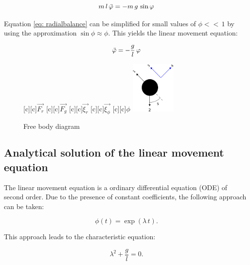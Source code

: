 \documentclass[12pt,bibstyle=none,pagenumberinfooter]{ifmdocument}
\begin{document}
\begin{equation}
\label{eq: tangentialbalance}
    m\, l \, \Ddot{\phi} = -m\, g \,\sin{\phi}
\end{equation}

Equation \ref{eq: radialbalance} can be simplified for small values of $\phi <<\, 1$ by using the approximation $\sin{\phi} \approx \phi $. This yields the linear movement equation:

\begin{equation}
    \Ddot{\phi} = -\frac{g}{l}\,\phi
\end{equation}





\begin{figure}[h]
  \begin{center}
    {
        \psfragscanon
      [c][c]{$\vec{F_r}$}
      [c][c]{$\vec{F_g}$}
      [c][c]{$\vec{\xi_r}$}
      [c][c]{$\vec{\xi_{\phi}}$}
      [c][c]{$\phi$}
      \includegraphics[width=0.2\textwidth]{Figures/Zeichnung2.eps}}
  \end{center}
  \caption{Free body diagram}
  \label{fig:free body}
\end{figure}


\subsection{Analytical solution of the linear movement equation}

The linear movement equation is a ordinary differential equation (ODE) of second order. Due to the presence of constant coefficients, the following approach can be taken:

\begin{equation}
\label{eq: linear}
    \phi (t) = \exp{(\lambda \, t)}.
\end{equation}

This approach leads to the characteristic equation:

\begin{equation}
    \lambda^2 + \frac{g}{l} = 0.
\end{equation}
\end{document}

